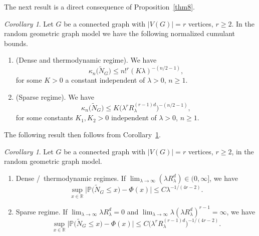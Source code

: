 \documentclass[bj,authoryear,noshowframe]{imsart}
\theoremstyle{plain}
\theoremstyle{remark}
\def\P{\mathbb{P}}
\def\real{{\mathord{\mathbb R}}}
\newtheorem{corollary}[prop]{Corollary}
\begin{document}
  The next result is a direct consequence of Proposition~\ref{thm8}. 
 \begin{corollary}
     \label{thm8-0}
  Let $G$ be a connected graph with $|V(G)|=r$ vertices, $r\geq 2$.
  In the random geometric graph model we have the following
  normalized cumulant bounds.  
  \begin{enumerate} %
  \item (Dense and thermodynamic regime). 
    We have
    \begin{equation}
      \kappa_n\big(\widetilde{N}_G\big) \leq n!^r ( K \lambda )^{-(n/2-1)}, 
 \end{equation}
 for some $K>0$ a constant independent
 of $\lambda >0$, $n\geq 1$. 
   \item (Sparse regime). 
    We have
    \begin{equation}
      \kappa_n\big(\widetilde{N}_G\big)\leq K \big(
       \lambda^r R_\lambda^{(r-1)d} \big)^{-(n/2-1)},
 \end{equation}
 for some constants $K_1, K_2 > 0$ independent of $\lambda >0$, $n\geq 1$. 
  \end{enumerate}
 \end{corollary}
  The following result then follows from Corollary~\ref{thm8-0}. 
 \begin{corollary}
   \label{jdkj10}
   Let $G$ be a connected graph with $|V(G)|=r$ vertices, $r\geq 2$,
   in the random geometric graph model.
   \begin{enumerate} %
     \item 
     Dense \!\! \slash \ thermodynamic regimes. 
   If $\lim_{\lambda\to\infty} (\lambda R_\lambda^d) \in (0,\infty]$, 
  we have
 \begin{equation}
 \nonumber
   \sup_{x\in \real}
 \big| \P \big( \widetilde{N}_G \leq x \big) - \Phi(x) \big| \leq
 C
 \lambda^{-1/ ( 4r - 2) }.
 \end{equation}
 \item
   Sparse regime.
   If $\lim_{\lambda\to\infty} \lambda R_\lambda^d = 0$ and
   $\lim_{\lambda\to\infty} \lambda(\lambda R_\lambda^d)^{r-1} = \infty$,
   we have 
 \begin{equation}
 \sup_{x\in \real}
 \big| \P \big( \widetilde{N}_G \leq x \big) - \Phi(x) \big| \leq
 C
 \big(\lambda^r R_\lambda^{(r-1)d}\big)^{-1/ ( 4r - 2) }.
 \end{equation}
 \end{enumerate}
 \end{corollary}
\end{document}
